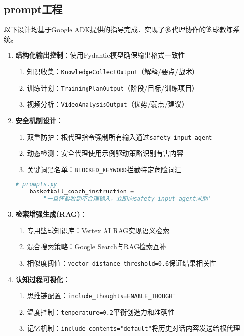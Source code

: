 \documentclass{article}
\theoremstyle{plain}
\theoremstyle{definition}
\theoremstyle{remark}
\begin{document}
\subsection{prompt工程}
以下设计均基于Google ADK提供的指导完成，实现了多代理协作的篮球教练系统。
\begin{enumerate}
    \item \textbf{结构化输出控制}：使用Pydantic模型确保输出格式一致性
    \begin{enumerate}
        \item 知识收集：\texttt{KnowledgeCollectOutput}（解释/要点/战术）
        \item 训练计划：\texttt{TrainingPlanOutput}（阶段/目标/训练项目）
        \item 视频分析：\texttt{VideoAnalysisOutput}（优势/弱点/建议）
    \end{enumerate}
    
    \item \textbf{安全机制设计}：
    \begin{enumerate}
        \item 双重防护：根代理指令强制所有输入通过\texttt{safety\_input\_agent}
        \item 动态检测：安全代理使用示例驱动策略识别有害内容
        \item 关键词黑名单：\texttt{BLOCKED\_KEYWORD}拦截特定危险词汇
    \end{enumerate}
    \begin{lstlisting}[language=Python]
    # prompts.py
    basketball_coach_instruction = 
        "一旦怀疑收到不合理输入，立即向safety_input_agent求助"
    \end{lstlisting}
    
    \item \textbf{检索增强生成(RAG)}：
    \begin{enumerate}
        \item 专用篮球知识库：Vertex AI RAG实现语义检索
        \item 混合搜索策略：Google Search与RAG检索互补
        \item 相似度阈值：\texttt{vector\_distance\_threshold=0.6}保证结果相关性
    \end{enumerate}
    
    \item \textbf{认知过程可视化}：
    \begin{enumerate}
        \item 思维链配置：\texttt{include\_thoughts=ENABLE\_THOUGHT}
        \item 温度控制：\texttt{temperature=0.2}平衡创造力和准确性
        \item 记忆机制：\texttt{include\_contents="default"}将历史对话内容发送给根代理
    \end{enumerate}


\end{enumerate}
\end{document}
